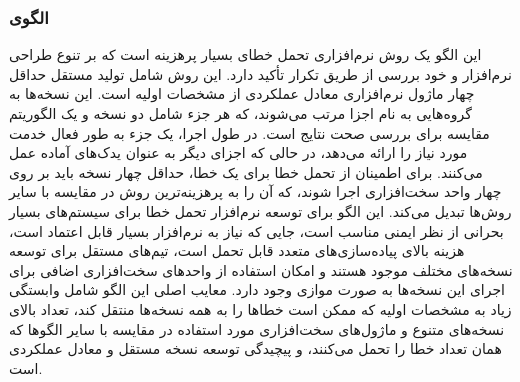 \subsubsection{الگوی }
\label{ArmoushSWNSelfChkProgSec}
\begin{RTL}
این الگو \cite{ref5}
یک روش نرم‌افزاری تحمل خطای بسیار پرهزینه است
که بر تنوع طراحی نرم‌افزار و خود بررسی از طریق تکرار تأکید دارد.
این روش شامل تولید مستقل حداقل چهار ماژول نرم‌افزاری معادل
عملکردی از مشخصات اولیه است.
این نسخه‌ها به گروه‌هایی به نام اجزا مرتب می‌شوند،
که هر جزء شامل دو نسخه و یک الگوریتم مقایسه برای بررسی صحت نتایج است.
در طول اجرا، یک جزء به طور فعال خدمت مورد نیاز را ارائه
می‌دهد، در حالی که اجزای دیگر به عنوان یدک‌های آماده عمل می‌کنند.
برای اطمینان از تحمل خطا برای یک خطا، حداقل چهار
نسخه باید بر روی چهار واحد سخت‌افزاری اجرا شوند، که آن
را به پرهزینه‌ترین روش در مقایسه با سایر روش‌ها تبدیل
می‌کند. این الگو برای توسعه نرم‌افزار تحمل خطا برای
سیستم‌های بسیار بحرانی از نظر ایمنی مناسب است، جایی که نیاز
به نرم‌افزار بسیار قابل اعتماد است، هزینه بالای پیاده‌سازی‌های
متعدد قابل تحمل است، تیم‌های مستقل برای
توسعه نسخه‌های مختلف موجود هستند و امکان
استفاده از واحدهای سخت‌افزاری اضافی برای اجرای
این نسخه‌ها به صورت موازی وجود دارد. معایب اصلی این الگو
شامل وابستگی زیاد به مشخصات اولیه که ممکن است خطاها را به همه
نسخه‌ها منتقل کند، تعداد بالای نسخه‌های متنوع و
ماژول‌های سخت‌افزاری مورد استفاده در مقایسه با سایر
الگوها که همان تعداد خطا را تحمل می‌کنند،
و پیچیدگی توسعه  نسخه‌ مستقل و معادل عملکردی است.
\end{RTL}